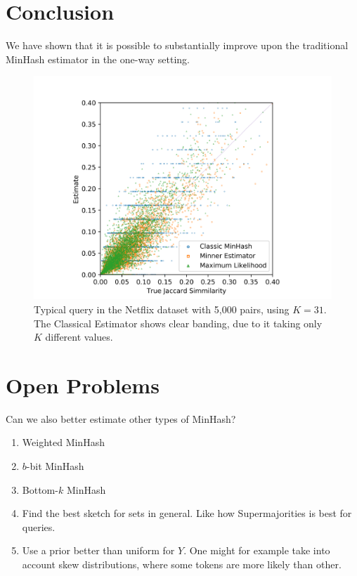 
\section{Conclusion}

We have shown that it is possible to substantially improve upon the traditional MinHash estimator in the one-way setting.

\begin{figure}[h]
   \centering
   \includegraphics[trim=10 0 10 30,clip,width=\linewidth]{figures/scatter}
   \caption{Typical query in the Netflix dataset with 5,000 pairs, using $K=31$.
      The Classical Estimator shows clear banding, due to it taking only $K$ different values.
   }
\end{figure}


\section{Open Problems}

Can we also better estimate other types of MinHash?
\begin{enumerate}
   \item Weighted MinHash
   \item $b$-bit MinHash
   \item Bottom-$k$ MinHash
   \item Find the best sketch for sets in general. Like how Supermajorities is best for queries.
   \item Use a prior better than uniform for $Y$.
      One might for example take into account skew distributions, where some tokens are more likely than other.
\end{enumerate}


